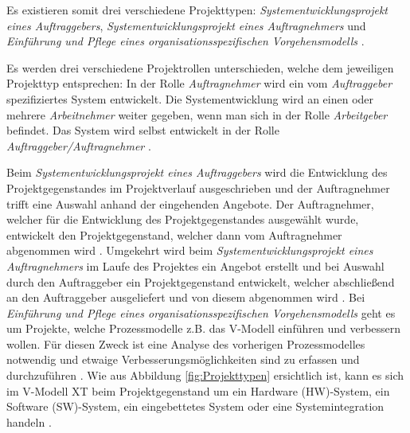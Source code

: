 Es existieren somit drei verschiedene Projekttypen: \textit{Systementwicklungsprojekt eines Auftraggebers}, \textit{Systementwicklungsprojekt eines Auftragnehmers} und \textit{Einführung und Pflege eines organisationsspezifischen Vorgehensmodells} \cite{reinhard2008}. \newline

Es werden drei verschiedene Projektrollen unterschieden, welche dem jeweiligen Projekttyp entsprechen: In der Rolle \textit{Auftragnehmer} wird ein vom \textit{Auftraggeber} spezifiziertes System entwickelt. Die Systementwicklung wird an einen oder mehrere \textit{Arbeitnehmer} weiter gegeben, wenn man sich in der Rolle \textit{Arbeitgeber} befindet. Das System  wird selbst entwickelt in der Rolle \textit{Auftraggeber/Auftragnehmer} \cite{brack2010,2004vmodell}.\newline


Beim \textit{Systementwicklungsprojekt eines Auftraggebers} wird die Entwicklung des Projektgegenstandes im Projektverlauf  ausgeschrieben und der Auftragnehmer trifft eine Auswahl anhand der eingehenden Angebote. Der Auftragnehmer, welcher für die Entwicklung des Projektgegenstandes ausgewählt wurde, entwickelt den Projektgegenstand, welcher dann vom Auftragnehmer abgenommen wird \cite{reinhard2008,2004vmodell}.\newline
Umgekehrt wird beim \textit{Systementwicklungsprojekt eines Auftragnehmers} im Laufe des Projektes ein Angebot erstellt und bei Auswahl durch den Auftraggeber ein Projektgegenstand entwickelt, welcher abschließend an den Auftraggeber ausgeliefert und von diesem abgenommen wird \cite{reinhard2008,2004vmodell}.\newline
Bei \textit{Einführung und Pflege eines organisationsspezifischen Vorgehensmodells} geht es um Projekte, welche Prozessmodelle z.B. das V-Modell einführen und verbessern wollen. Für diesen Zweck ist eine Analyse des vorherigen Prozessmodelles notwendig und etwaige Verbesserungsmöglichkeiten sind zu erfassen und durchzuführen \cite{reinhard2008,2004vmodell}.\newline
Wie aus Abbildung \ref{fig:Projekttypen} ersichtlich ist, kann es sich im V-Modell XT beim Projektgegenstand um ein Hardware (HW)-System, ein Software (SW)-System, ein eingebettetes System oder eine Systemintegration handeln \cite{brack2010,2004vmodell}. \newline

